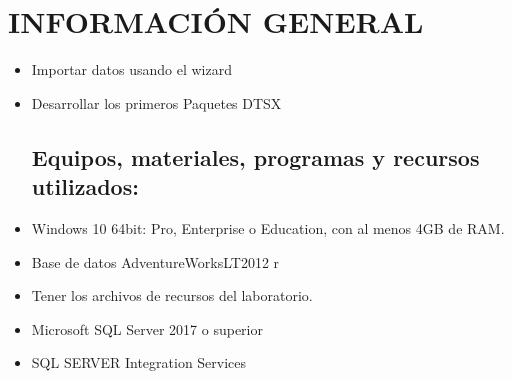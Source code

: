 \section{INFORMACIÓN GENERAL} 

\begin{itemize}
\subsection{Objetivos:}
	\item Importar datos usando el wizard
	\item Desarrollar los primeros Paquetes DTSX

\subsection{Equipos, materiales, programas y recursos utilizados:}
	\item Windows 10 64bit: Pro, Enterprise o Education, con al menos 4GB de RAM.
	\item Base de datos AdventureWorksLT2012 r
	\item Tener los archivos de recursos del laboratorio.
	\item Microsoft SQL Server 2017 o superior
	\item SQL SERVER Integration Services

\end{itemize}
